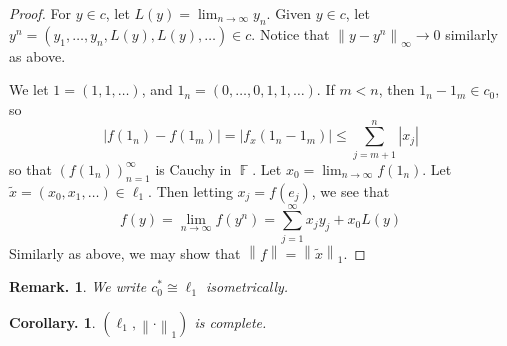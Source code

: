 \documentclass[11pt, a4paper]{memoir}
\DeclareMathOperator{\F}{{\mathbb{F}}}
\newcommand{\norm}[1]{\ensuremath{\left\lVert#1\right\rVert}}
\theoremstyle{change}
\newtheorem{corollary}[theorem]{Corollary.}
\theoremstyle{plain}
\theoremstyle{nonumberplain}
\newtheorem{remark}{Remark.}
\newtheorem{proof}{Proof}
\numberwithin{equation}{section}
\begin{document}
\begin{proof}
    For $y\in c$, let $L(y)=\lim_{n\to\infty}y_n$.
    Given $y\in c$, let $y^n=(y_1,\ldots,y_n,L(y),L(y),\ldots)\in c$.
    Notice that $\norm{y-y^n}_\infty\to 0$ similarly as above.

    We let $1=(1,1,\ldots)$, and $1_n=(0,\ldots,0,1,1,\ldots)$.
    If $m<n$, then $1_n-1_m\in c_0$, so
    \begin{equation*}
        |f(1_n)-f(1_m)| = |f_x(1_n-1_m)|\leq \sum_{j=m+1}^n|x_j|
    \end{equation*}
    so that $(f(1_n))_{n=1}^\infty$ is Cauchy in $\F$.
    Let $x_0=\lim_{n\to\infty}f(1_n)$.
    Let $\tilde x=(x_0,x_1,\ldots)\in\ell_1$.
    Then letting $x_j=f(e_j)$, we see that
    \begin{equation*}
        f(y)=\lim_{n\to\infty}f(y^n)=\sum_{j=1}^\infty x_jy_j+x_0L(y)
    \end{equation*}
    Similarly as above, we may show that $\norm{f}=\norm{\tilde x}_1$.


\end{proof}
\begin{remark}
    We write $c_0^*\cong\ell_1$ isometrically.
\end{remark}
\begin{corollary}
    $(\ell_1,\norm{\cdot}_1)$ is complete.
\end{corollary}
\end{document}
